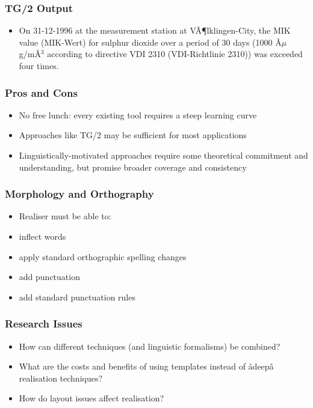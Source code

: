 \documentclass[compress,color=usenames]{beamer}
\begin{document}
\begin{frame}
\frametitle{
TG/2 Output}

\label{f61}
\begin{itemize}
\item {{On 31-12-1996 at the measurement station at V\~A{\P}lklingen-City, the MIK value (MIK-Wert) for sulphur dioxide over a period of 30 days (1000 \^A\mbox{$\mu$}g/m\^A\mbox{${}^3$} according to directive VDI 2310 (VDI-Richtlinie 2310)) was exceeded four times. }}
\end{itemize}
 
\end{frame}

\begin{frame}
\frametitle{
Pros and Cons}

\label{f63}
\begin{itemize}
\item {{No free lunch:  every existing tool requires a steep learning curve}}
\item {{Approaches like TG/2 may be sufficient for most applications}}
\item {{Linguistically-motivated approaches require some theoretical commitment and understanding, but promise broader coverage and consistency}}
\end{itemize}
 
\end{frame}

\begin{frame}
\frametitle{
Morphology and Orthography}

\label{f65}
\begin{itemize}
\item {{Realiser must be able to:}}
\item {{inflect words}}
\item {{apply standard orthographic spelling changes}}
\item {{add punctuation}}
\item {{add standard punctuation rules}}
\end{itemize}
 
\end{frame}

\begin{frame}
\frametitle{
Research Issues}

\label{f67}
\begin{itemize}
\item {{How can different techniques (and linguistic formalisms) be combined?}}
\item {{What are the costs and benefits of using templates instead of \^adeep\^a realisation techniques? }}
\item {{How do layout issues affect realisation?}}
\end{itemize}
 
\end{frame}
\end{document}
